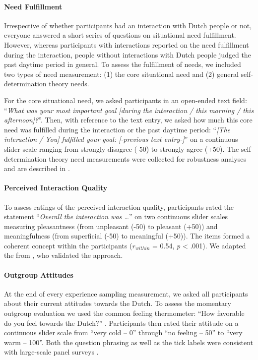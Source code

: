 \paragraph{Need Fulfillment}

Irrespective of whether participants had an interaction with Dutch
people or not, everyone answered a short series of questions on
situational need fulfillment. However, whereas participants with
interactions reported on the need fulfillment during the interaction,
people without interactions with Dutch people judged the past daytime
period in general. To assess the fulfillment of needs, we included two
types of need measurement: (1) the core situational need and (2) general
self-determination theory needs.

For the core situational need, we asked participants in an open-ended
text field:
``\textit{What was your most important goal [during the interaction / this morning / this afternoon]?}''.
Then, with reference to the text entry, we asked how much this core need
was fulfilled during the interaction or the past daytime period:
``\textit{[The interaction / You] fulfilled your goal: [-previous text entry-]}''
on a continuous slider scale ranging from strongly disagree (-50) to
strongly agree (+50). The self-determination theory need measurements
were collected for robustness analyses and are described in
.

\paragraph{Perceived Interaction Quality}

To assess ratings of the perceived interaction quality, participants
rated the statement ``\textit{Overall the interaction was …}'' on two
continuous slider scales measuring pleasantness (from unpleasant (-50)
to pleasant (+50)) and meaningfulness (from superficial (-50) to
meaningful (+50)). The items formed a coherent concept within the
participants (\(r_{within}\) = 0.54, \textit{p} \textless{} .001). We
adapted the from \citet[][]{Downie2008}, who validated the approach.

\paragraph{Outgroup Attitudes}

At the end of every experience sampling measurement, we asked all
participants about their current attitudes towards the Dutch. To assess
the momentary outgroup evaluation we used the common feeling
thermometer: ``How favorable do you feel towards the Dutch?''
\citep[][]{Lavrakas2008}. Participants then rated their attitude on a
continuous slider scale from ``very cold -- 0'' through ``no feeling --
50'' to ``very warm -- 100''. Both the question phrasing as well as the
tick labels were consistent with large-scale panel surveys
\citep[e.g.,][]{DeBell2010}.

